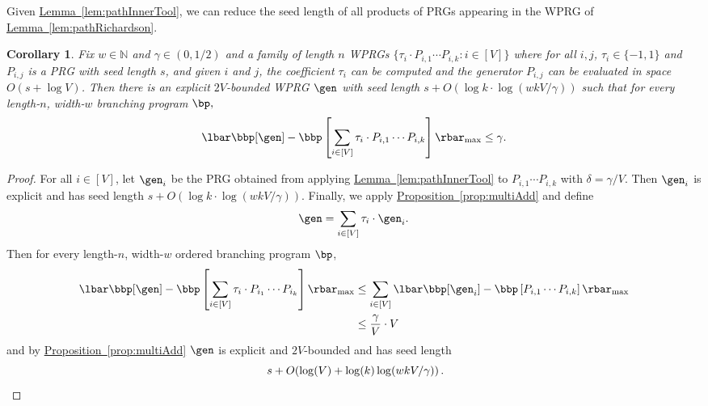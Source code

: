 \documentclass[11pt]{article}
\newcommand{\expref}[2]{\texorpdfstring{\hyperref[#2]{#1~\ref{#2}}}{#1~\ref{#2}}}
\newtheorem{corollary}[theorem]{Corollary}
\newcommand{\N}{{\mathbb N}}
\begin{document}
Given \expref{Lemma}{lem:pathInnerTool}, we can reduce the seed length of all products of PRGs appearing in the WPRG of \expref{Lemma}{lem:pathRichardson}.
\begin{corollary}\label{cor:pathInner}
Fix $w \in \N$ and $\gamma \in (0,1/2)$ and a family of length $n$ WPRGs $\{\tau_i\cdot P_{i,1}\cdots P_{i,k}:i\in[V]\}$ where for all $i,j$, $\tau_i\in \{-1,1\}$ and $P_{i,j}$ is a PRG with seed length $s$, and given $i$ and $j$, the coefficient $\tau_i$ can be computed and the generator $P_{i,j}$ can be evaluated in space $O(s+\log V)$. Then there is an explicit $2V$-bounded WPRG $\gen$ with seed length $s+O(\log k\cdot \log(wkV/\gamma))$ such that for every length-$n$, width-$w$ branching program $\bp,$
$$\lbar\bbp[\gen] - \bbp\left[\sum_{i\in [V]}\tau_i\cdot P_{i,1}\cdots P_{i,k}\right]\rbar_{\max}\leq \gamma.$$
\end{corollary}
\begin{proof}
For all $i\in [V]$, let $\gen_i$ be the PRG obtained from applying \expref{Lemma}{lem:pathInnerTool} to $P_{i,1}\cdots P_{i,k}$ with $\delta=\gamma/V$. Then $\gen_i$ is explicit and has seed length $s+O(\log k\cdot\log(wkV/\gamma))$.
Finally, we apply \expref{Proposition}{prop:multiAdd} and define
$$\gen=\sum_{i\in [V]} \tau_i\cdot \gen_i.$$ 
Then for every length-$n$, width-$w$ ordered branching program $\bp$,
\begin{align*}
    \lbar\bbp[\gen] - \bbp\left[\sum_{i\in [V]}\tau_i\cdot P_{i_1}\cdots P_{i_k}\right]\rbar_{\max} &\leq  \sum_{i\in [V]}\lbar \bbp[\gen_i] - \bbp\left[P_{i,1}\cdots P_{i,k}\right] \rbar_{\max}\\
    &\leq \frac{\gamma}{V}\cdot V
\end{align*}
and by \expref{Proposition}{prop:multiAdd} $\gen$ is explicit and $2V$-bounded and has seed length
%
\[\ s+O(\log(V)+\log(k)\log(wkV/\gamma))\,.   \qedhere  \]
%
\end{proof}
\end{document}
